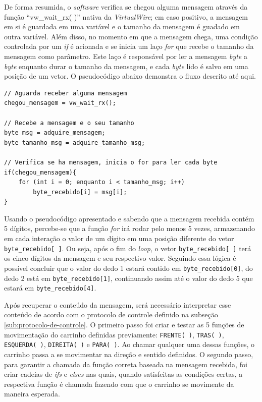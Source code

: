 \documentclass[
	12pt,				%
	openright,			%
	oneside,			%
	a4paper,			%
	english,			%
	brazil				%
	]{abntex2}
\begin{document}
		De forma resumida, o \textit{software} verifica se chegou alguma mensagem através da função ``vw\_wait\_rx( )'' nativa da \textit{VirtualWire}; em caso positivo, a mensagem em si é guardada em uma variável e o tamanho da mensagem é guadado em outra variável. Além disso, no momento em que a mensagem chega, uma condição controlada por um \textit{if} é acionada e se inicia um laço \textit{for} que recebe o tamanho da mensagem como parâmetro. Este laço é responsável por ler a mensagem \textit{byte} a \textit{byte} enquanto durar o tamanho da mensagem, e cada \textit{byte} lido é salvo em uma posição de um vetor. O pseudocódigo abaixo demonstra o fluxo descrito até aqui.
\begin{lstlisting}
// Aguarda receber alguma mensagem
chegou_mensagem = vw_wait_rx();

// Recebe a mensagem e o seu tamanho
byte msg = adquire_mensagem;
byte tamanho_msg = adquire_tamanho_msg;
	
// Verifica se ha mensagem, inicia o for para ler cada byte
if(chegou_mensagem){
	for (int i = 0; enquanto i < tamanho_msg; i++)
		byte_recebido[i] = msg[i];		
}
\end{lstlisting}

		Usando o pseudocódigo apresentado e sabendo que a mensagem recebida contém 5 dígitos, percebe-se que a função \textit{for} irá rodar pelo menos 5 vezes, armazenando em cada interação o valor de um dígito em uma posição diferente do vetor \texttt{byte\_recebido[ ]}. Ou seja, após o fim do \textit{loop}, o vetor \texttt{byte\_recebido[ ]} terá os cinco dígitos da mensagem e seu respectivo valor. Seguindo essa lógica é possível concluir que o valor do dedo 1 estará contido em \texttt{byte\_recebido[0]}, do dedo 2 está em \texttt{byte\_recebido[1]}, continuando assim até o valor do dedo 5 que estará em \texttt{byte\_recebido[4]}.
		
		Após recuperar o conteúdo da mensagem, será necessário interpretar esse conteúdo de acordo com o protocolo de controle definido na subseção \ref{sub:protocolo-de-controle}. O primeiro passo foi criar e testar as 5 funções de movimentação do carrinho definidas previamente: \texttt{FRENTE( )}, \texttt{TRAS( )}, \texttt{ESQUERDA( )}, \texttt{DIREITA( )} e \texttt{PARA( )}. Ao chamar qualquer uma dessas funções, o carrinho passa a se movimentar na direção e sentido definidos. O segundo passo, para garantir a chamada da função correta baseada na mensagem recebida, foi criar cadeias de \textit{ifs} e \textit{elses} nas quais, quando satisfeitas as condições certas, a respectiva função é chamada fazendo com que o carrinho se movimente da maneira esperada. 
		
\end{document}
